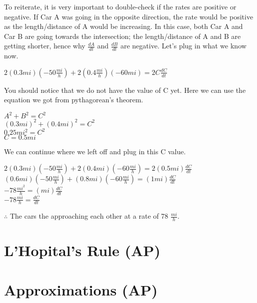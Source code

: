 \documentclass[12pt,fleqn]{book} %
\begin{document}
\noindent To reiterate, it is very important to double-check if the rates are positive or negative. If Car A was going in the opposite direction, the rate would be
positive as the length/distance of A would be increasing. In this case, both Car A and Car B are going towards the intersection; the length/distance of A and B are
getting shorter, hence why $\frac{dA}{dt}$ and $\frac{dB}{dt}$ are negative. Let's plug in what we know now.

\begin{center}
    $2(0.3mi)(-50\frac{mi}{h})+2(0.4\frac{mi}{h})(-60mi)=2C\frac{dC}{dt}$ \\
\end{center}

\noindent You should notice that we do not have the value of C yet. Here we can use the equation we got from pythagorean's theorem.

\begin{center}
    $A^2+B^2=C^2$ \\
    \vspace*{1mm}
    $(0.3mi)^2+(0.4mi)^2=C^2$ \\
    \vspace*{1mm}
    $0.25mi^2=C^2$ \\
    \vspace*{1mm}
    $C=0.5mi$
\end{center}

\noindent We can continue where we left off and plug in this C value.

\begin{center}
    $2(0.3mi)(-50\frac{mi}{h})+2(0.4mi)(-60\frac{mi}{h})=2(0.5mi)\frac{dC}{dt}$ \\
    \vspace*{1mm}
    $(0.6mi)(-50\frac{mi}{h})+(0.8mi)(-60\frac{mi}{h})=(1mi)\frac{dC}{dt}$ \\
    \vspace*{1mm}
    $-78\frac{mi^2}{h}=(mi)\frac{dC}{dt}$ \\
    \vspace*{1mm}
    $-78\frac{mi}{h}=\frac{dC}{dt}$
\end{center}

\noindent $\therefore$ The cars the approaching each other at a rate of 78 $\frac{mi}{h}$.

\vspace*{5mm}

\noindent {\small }

\section{L'Hopital's Rule (AP)}

\section{Approximations (AP)}
\end{document}

